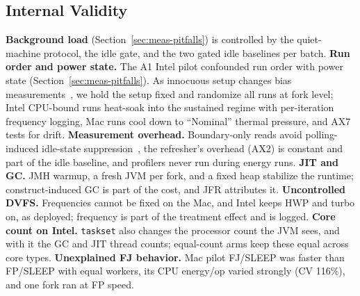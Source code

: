 \subsection{Internal Validity}
\textbf{Background load} (Section~\ref{sec:meas-pitfalls}) is controlled by the quiet-machine protocol, the idle gate, and the two gated idle baselines per batch.
\textbf{Run order and power state.} The A1 Intel pilot confounded run order with power state (Section~\ref{sec:meas-pitfalls}). As innocuous setup changes bias measurements~\cite{mytkowicz2009wrong}, we hold the setup fixed and randomize all runs at fork level; Intel CPU-bound runs heat-soak into the sustained regime with per-iteration frequency logging, Mac runs cool down to ``Nominal'' thermal pressure, and AX7 tests for drift. 
\textbf{Measurement overhead.} Boundary-only reads avoid polling-induced idle-state suppression~\cite{raffin2025dissecting}, the refresher's overhead (AX2) is constant and part of the idle baseline, and profilers never run during energy runs.
\textbf{JIT and GC.} JMH warmup, a fresh JVM per fork, and a fixed heap stabilize the runtime; construct-induced GC is part of the cost, and JFR attributes it.
\textbf{Uncontrolled DVFS.} Frequencies cannot be fixed on the Mac, and Intel keeps HWP and turbo on, as deployed; frequency is part of the treatment effect and is logged.
\textbf{Core count on Intel.} \texttt{taskset} also changes the processor count the JVM sees, and with it the GC and JIT thread counts; equal-count arms keep these equal across core types.
\textbf{Unexplained FJ behavior.} Mac pilot FJ/SLEEP was faster than FP/SLEEP with equal workers, its CPU energy/op varied strongly (CV 116\%), and one fork ran at FP speed. 

